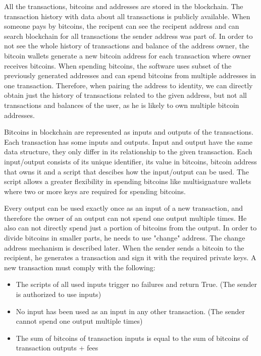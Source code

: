 \documentclass[
  digital, %
  table,   %
  lof,     %
  lot,     %
  oneside
]{fithesis3}
\begin{document}
All the transactions, bitcoins and addresses are stored in the blockchain.
The transaction history with data about all transactions is publicly available.
When someone pays by bitcoins, the recipent can see the recipent address
and can search blockchain for all transactions the sender address was part of.
In order to not see the whole history of transactions and balance of the address owner,
the bitcoin wallets generate a new bitcoin address for each transaction where
owner receives bitcoins.
When spending bitcoins, the software uses subset of the previously generated addresses and
can spend bitcoins from multiple addresses in one transaction.
Therefore, when pairing the address to identity,
we can directly obtain just the history of transactions related to the given
address, but not all transactions and balances of the user,
as he is likely to own multiple bitcoin addresses.

Bitcoins in blockchain are represented as inputs and outputs of the transactions.
Each transaction has some inputs and outputs. 
Input and output have the same data structure,
they only differ in its relationship to the given transaction.
Each input/output consists of its unique identifier, its value in bitcoins,
bitcoin address that owns it and a script that descibes how the input/output can be used.
The script allows a greater flexibility in spending bitcoins like multisignature wallets where
two or more keys are required for spending bitcoins.

Every output can be used exactly once as an input of a new transaction,
and therefore the owner of an output can not
spend one output multiple times. He also can not directly
spend just a portion of bitcoins from the output. In order to divide bitcoins in smaller parts,
he needs to use "change" address. The change address mechanism is described later.
When the sender sends a bitcoin to the recipient, he generates a transaction
and sign it with the required private keys.
A new transaction must comply with the following:

\begin{itemize}
  \item The scripts of all used inputs trigger no failures and return True. (The sender is authorized to use inputs)
  \item No input has been used as an input in any other transaction. \newline (The sender cannot spend one output multiple times)
  \item The sum of bitcoins of transaction inputs is equal to the sum of bitcoins of transaction outputs + fees
\end{itemize}
\end{document}
